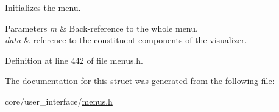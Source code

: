 Initializes the menu. 


\begin{DoxyParams}{Parameters}
{\em m} & Back-\/reference to the whole menu. \\
\hline
{\em data} & reference to the constituent components of the visualizer. \\
\hline
\end{DoxyParams}


Definition at line 442 of file menus.\+h.



The documentation for this struct was generated from the following file\+:\begin{DoxyCompactItemize}
\item 
core/user\+\_\+interface/\hyperlink{menus_8h}{menus.\+h}\end{DoxyCompactItemize}
